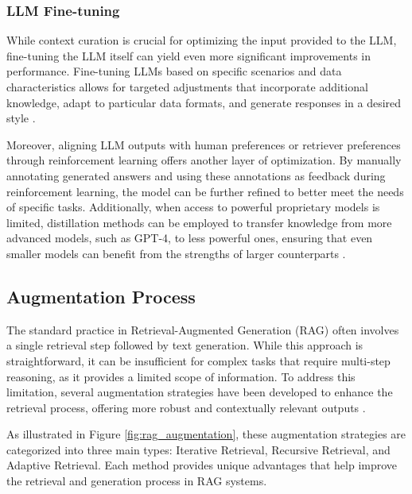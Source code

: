 \subsubsection{LLM Fine-tuning}

While context curation is crucial for optimizing the input provided to the LLM, fine-tuning the LLM itself can yield even more significant improvements in performance. Fine-tuning LLMs based on specific scenarios and data characteristics allows for targeted adjustments that incorporate additional knowledge, adapt to particular data formats, and generate responses in a desired style \cite{du2022retrieval}.

Moreover, aligning LLM outputs with human preferences or retriever preferences through reinforcement learning offers another layer of optimization. By manually annotating generated answers and using these annotations as feedback during reinforcement learning, the model can be further refined to better meet the needs of specific tasks. Additionally, when access to powerful proprietary models is limited, distillation methods can be employed to transfer knowledge from more advanced models, such as GPT-4, to less powerful ones, ensuring that even smaller models can benefit from the strengths of larger counterparts \cite{shi2023dual}.

\subsection{Augmentation Process}

The standard practice in Retrieval-Augmented Generation (RAG) often involves a single retrieval step followed by text generation. While this approach is straightforward, it can be insufficient for complex tasks that require multi-step reasoning, as it provides a limited scope of information. To address this limitation, several augmentation strategies have been developed to enhance the retrieval process, offering more robust and contextually relevant outputs \cite{yoran2023making}.

As illustrated in Figure \ref{fig:rag_augmentation}, these augmentation strategies are categorized into three main types: Iterative Retrieval, Recursive Retrieval, and Adaptive Retrieval. Each method provides unique advantages that help improve the retrieval and generation process in RAG systems.

